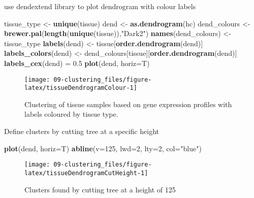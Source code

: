 \documentclass[]{book}
\newenvironment{Shaded}{\begin{snugshade}}{\end{snugshade}}
\newcommand{\KeywordTok}[1]{\textcolor[rgb]{0.13,0.29,0.53}{\textbf{{#1}}}}
\newcommand{\DataTypeTok}[1]{\textcolor[rgb]{0.13,0.29,0.53}{{#1}}}
\newcommand{\DecValTok}[1]{\textcolor[rgb]{0.00,0.00,0.81}{{#1}}}
\newcommand{\FloatTok}[1]{\textcolor[rgb]{0.00,0.00,0.81}{{#1}}}
\newcommand{\StringTok}[1]{\textcolor[rgb]{0.31,0.60,0.02}{{#1}}}
\newcommand{\NormalTok}[1]{{#1}}
\theoremstyle{definition}
\theoremstyle{definition}
\theoremstyle{definition}
\theoremstyle{remark}
\begin{document}
use dendextend library to plot dendrogram with colour labels

\begin{Shaded}
\begin{Highlighting}[]
\NormalTok{tissue_type <-}\StringTok{ }\KeywordTok{unique}\NormalTok{(tissue)}
\NormalTok{dend <-}\StringTok{ }\KeywordTok{as.dendrogram}\NormalTok{(hc)}
\NormalTok{dend_colours <-}\StringTok{ }\KeywordTok{brewer.pal}\NormalTok{(}\KeywordTok{length}\NormalTok{(}\KeywordTok{unique}\NormalTok{(tissue)),}\StringTok{"Dark2"}\NormalTok{)}
\KeywordTok{names}\NormalTok{(dend_colours) <-}\StringTok{ }\NormalTok{tissue_type}
\KeywordTok{labels}\NormalTok{(dend) <-}\StringTok{ }\NormalTok{tissue[}\KeywordTok{order.dendrogram}\NormalTok{(dend)]}
\KeywordTok{labels_colors}\NormalTok{(dend) <-}\StringTok{ }\NormalTok{dend_colours[tissue][}\KeywordTok{order.dendrogram}\NormalTok{(dend)]}
\KeywordTok{labels_cex}\NormalTok{(dend) =}\StringTok{ }\FloatTok{0.5}
\KeywordTok{plot}\NormalTok{(dend, }\DataTypeTok{horiz=}\NormalTok{T)}
\end{Highlighting}
\end{Shaded}

\begin{figure}

{\centering \texttt{[image: 09-clustering\_files/figure-latex/tissueDendrogramColour-1]} 

}

\caption{Clustering of tissue samples based on gene expression profiles with labels coloured by tissue type. }\label{fig:tissueDendrogramColour}
\end{figure}

Define clusters by cutting tree at a specific height

\begin{Shaded}
\begin{Highlighting}[]
\KeywordTok{plot}\NormalTok{(dend, }\DataTypeTok{horiz=}\NormalTok{T)}
\KeywordTok{abline}\NormalTok{(}\DataTypeTok{v=}\DecValTok{125}\NormalTok{, }\DataTypeTok{lwd=}\DecValTok{2}\NormalTok{, }\DataTypeTok{lty=}\DecValTok{2}\NormalTok{, }\DataTypeTok{col=}\StringTok{"blue"}\NormalTok{)}
\end{Highlighting}
\end{Shaded}

\begin{figure}

{\centering \texttt{[image: 09-clustering\_files/figure-latex/tissueDendrogramCutHeight-1]} 

}

\caption{Clusters found by cutting tree at a height of 125}\label{fig:tissueDendrogramCutHeight}
\end{figure}
\end{document}
